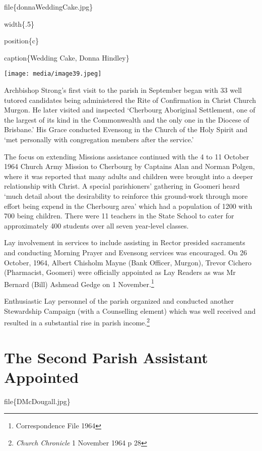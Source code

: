 file\{donnaWeddingCake.jpg\}

width\{.5\}

position\{c\}

caption\{Wedding Cake, Donna Hindley\}

\texttt{[image: media/image39.jpeg]}

Archbishop Strong's first visit to the parish in September began with 33 well tutored candidates being administered the Rite of Confirmation in Christ Church Murgon. He later visited and inspected `Cherbourg Aboriginal Settlement, one of the largest of its kind in the Commonwealth and the only one in the Diocese of Brisbane.' His Grace conducted Evensong in the Church of the Holy Spirit and `met personally with congregation members after the service.'

The focus on extending Missions assistance continued with the 4 to 11 October 1964 Church Army Mission to Cherbourg by Captains Alan and Norman Polgen, where it was reported that many adults and children were brought into a deeper relationship with Christ. A special parishioners' gathering in Goomeri heard `much detail about the desirability to reinforce this ground-work through more effort being expend in the Cherbourg area' which had a population of 1200 with 700 being children. There were 11 teachers in the State School to cater for approximately 400 students over all seven year-level classes.

Lay involvement in services to include assisting in Rector presided sacraments and conducting Morning Prayer and Evensong services was encouraged. On 26 October, 1964, Albert Chisholm Mayne (Bank Officer, Murgon), Trevor Cichero (Pharmacist, Goomeri) were officially appointed as Lay Readers as was Mr Bernard (Bill) Ashmead Gedge on 1 November.\footnote{Correspondence File 1964}

Enthusiastic Lay personnel of the parish organized and conducted another Stewardship Campaign (with a Counselling element) which was well received and resulted in a substantial rise in parish income.\footnote{\emph{Church Chronicle} 1 November 1964 p 28}

\hypertarget{the-second-parish-assistant-appointed}{%
\section{The Second Parish Assistant Appointed}\label{the-second-parish-assistant-appointed}}

file\{DMcDougall.jpg\}

